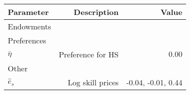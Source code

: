 \begin{tabular}{lrr}
\hline
Parameter & Description  & Value  \\
\hline
Endowments &   &   \\
Preferences &   &   \\
$\bar{\eta}$ & Preference for HS  & $0.00$  \\
Other &   &   \\
$\hat{e}_{s}$ & Log skill prices  & -0.04, -0.01, 0.44  \\
\hline
\end{tabular}%

